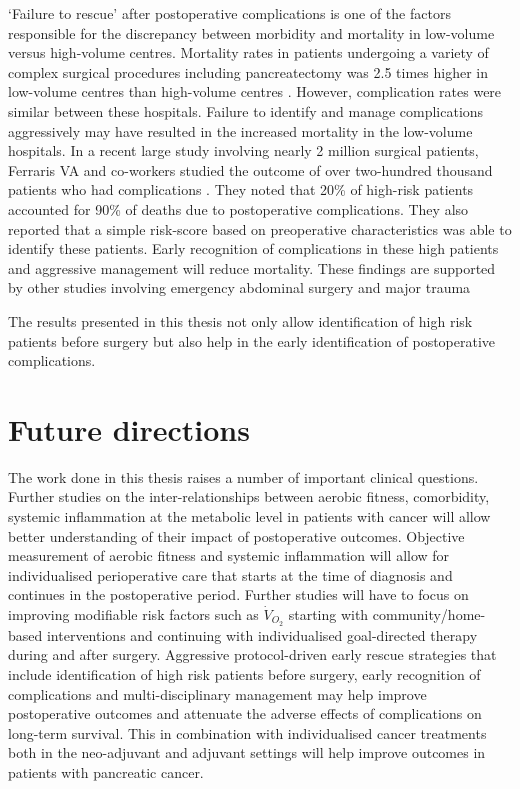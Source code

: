`Failure to rescue' after postoperative complications is one of the factors responsible for the discrepancy between morbidity and mortality in low-volume versus high-volume centres.
Mortality rates in patients undergoing a variety of complex surgical procedures including pancreatectomy was 2.5 times higher in low-volume centres than high-volume centres \parencite{ghaferi_complications_2009}.
However, complication rates were similar between these hospitals. 
Failure to identify and manage complications aggressively may have resulted in the increased mortality in the low-volume hospitals.
In a recent large study involving nearly 2 million surgical patients, Ferraris VA and co-workers studied the outcome of over two-hundred thousand patients who had complications \parencite{ferraris_va_identification_2014}. 
They noted that 20\% of high-risk patients accounted for 90\% of deaths due to postoperative complications. 
They also reported that a simple risk-score based on preoperative characteristics was able to identify these patients. 
Early recognition of complications in these high patients and aggressive management will reduce mortality.
These findings are supported by other studies involving emergency abdominal surgery \parencite{sheetz_improving_2013} and major trauma \parencite{haas_prevention_2011}

The results presented in this thesis not only allow identification of high risk patients before surgery but also help in the early identification of postoperative complications. 

\section{Future directions}

The work done in this thesis raises a number of important clinical questions. 
Further studies on the inter-relationships between aerobic fitness, comorbidity, systemic inflammation at the metabolic level in patients with cancer will allow better understanding of their impact of postoperative outcomes. 
Objective measurement of aerobic fitness and systemic inflammation will allow for individualised perioperative care that starts at the time of diagnosis and continues in the postoperative period. 
Further studies will have to focus on improving modifiable risk factors such as $\dot{V}_{O_2}$ starting with community/home-based interventions and continuing with individualised goal-directed therapy during and after surgery.
Aggressive protocol-driven early rescue strategies that include identification of high risk patients before surgery, early recognition of complications and multi-disciplinary management may help improve postoperative outcomes and attenuate the adverse effects of complications on long-term survival.
This in combination with individualised cancer treatments both in the neo-adjuvant and adjuvant settings will help improve outcomes in patients with pancreatic cancer.



